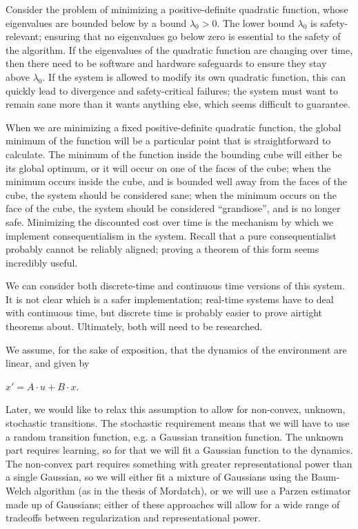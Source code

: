 \documentclass[11pt]{article}
\begin{document}
Consider the problem of minimizing a positive-definite quadratic
function, whose eigenvalues are bounded below by a bound $\lambda_0 >
0$. The lower bound $\lambda_0$ is safety-relevant; ensuring that no
eigenvalues go below zero is essential to the safety of the
algorithm. If the eigenvalues of the quadratic function are changing
over time, then there need to be software and hardware safeguards to
ensure they stay above $\lambda_0$. If the system is allowed to modify
its own quadratic function, this can quickly lead to divergence and
safety-critical failures; the system must want to remain sane more
than it wants anything else, which seems difficult to guarantee.

When we are minimizing a fixed positive-definite quadratic function,
the global minimum of the function will be a particular point that is
straightforward to calculate. The minimum of the function inside the
bounding cube will either be its global optimum, or it will occur on
one of the faces of the cube; when the minimum occurs inside the cube,
and is bounded well away from the faces of the cube, the system should
be considered sane; when the minimum occurs on the face of the cube,
the system should be considered ``grandiose'', and is no longer
safe. Minimizing the discounted cost over time is the mechanism by
which we implement consequentialism in the system. Recall that a pure
consequentialist probably cannot be reliably aligned; proving a
theorem of this form seems incredibly useful.

We can consider both discrete-time and continuous time versions of
this system. It is not clear which is a safer implementation;
real-time systems have to deal with continuous time, but discrete time
is probably easier to prove airtight theorems about. Ultimately, both
will need to be researched.

We assume, for the sake of exposition, that the dynamics of the
environment are linear, and given by

$x' = A \cdot u + B \cdot x$.

Later, we would like to relax this assumption to allow for non-convex,
unknown, stochastic transitions. The stochastic requirement means that
we will have to use a random transition function, e.g. a Gaussian
transition function. The unknown part requires learning, so for that
we will fit a Gaussian function to the dynamics. The non-convex part
requires something with greater representational power than a single
Gaussian, so we will either fit a mixture of Gaussians using the
Baum-Welch algorithm (as in the thesis of Mordatch), or we will use a
Parzen estimator made up of Gaussians; either of these approaches will
allow for a wide range of tradeoffs between regularization and
representational power.
\end{document}
